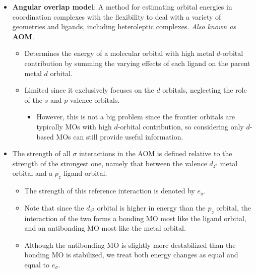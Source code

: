 \documentclass[../notes.tex]{subfiles}
\begin{document}
\begin{itemize}
\begin{itemize}
\begin{figure}[H]
            \caption{Tetrahedral  orbital diagram.}
            \label{fig:orbitalDiagram-MH4-tetrahedral}
        \end{figure}
        \begin{itemize}
            \item Recall that $\Delta_t\approx\frac{4}{9}\Delta_o$ under the same ligands.
        \end{itemize}
        \item For the $\sigma$ case, ignore all $\pi^*$-derived orbitals in Figure \ref{fig:orbitalDiagram-MH4-tetrahedral}. For the $\pi$ case, consider them.
    \end{itemize}
    \item {}\textbf{Angular overlap model}: A method for estimating orbital energies in coordination complexes with the flexibility to deal with a variety of geometries and ligands, including heteroleptic complexes. \emph{Also known as} \textbf{AOM}.
    \begin{itemize}
        \item Determines the energy of a molecular orbital with high metal $d$-orbital contribution by summing the varying effects of each ligand on the parent metal $d$ orbital.
        \item Limited since it exclusively focuses on the $d$ orbitals, neglecting the role of the $s$ and $p$ valence orbitals.
        \begin{itemize}
            \item However, this is not a big problem since the frontier orbitals are typically MOs with high $d$-orbital contribution, so considering only $d$-based MOs can still provide useful information.
        \end{itemize}
    \end{itemize}
    \item The strength of all $\sigma$ interactions in the AOM is defined relative to the strength of the strongest one, namely that between the valence $d_{z^2}$ metal orbital and a $p_z$ ligand orbital.
    \begin{itemize}
        \item The strength of this reference interaction is denoted by $e_\sigma$.
        \item Note that since the $d_{z^2}$ orbital is higher in energy than the $p_z$ orbital, the interaction of the two forms a bonding MO most like the ligand orbital, and an antibonding MO most like the metal orbital.
        \item Although the antibonding MO is slightly more destabilized than the bonding MO is stabilized, we treat both energy changes as equal and equal to $e_\sigma$.

\end{itemize}
\end{itemize}
\end{document}
